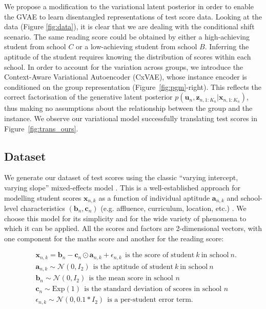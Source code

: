 \documentclass{article} %
\begin{document}
We propose a modification to the variational latent posterior in order to enable the GVAE to learn disentangled representations of test score data. Looking at the data (Figure \ref{fig:data}), it is clear that we are dealing with the conditional shift scenario. The same reading score could be obtained by either a high-achieving student from school $C$ or a low-achieving student from school $B$. Inferring the aptitude of the student requires knowing the distribution of scores within each school. In order to account for the variation across groups, we introduce the Context-Aware Variational Autoencoder (CxVAE), whose instance encoder is conditioned on the group representation (Figure~\ref{fig:pgm}-right). This reflects the correct factorisation of the generative latent posterior $p(\mathbf{u}_n, \mathbf{z}_{n,1:K_n} | \mathbf{x}_{n,1:K_n})$, thus making no assumptions about the relationship between the group and the instance. We observe our variational model successfully translating test scores in Figure~\ref{fig:trans_ours}.

\subsection{Dataset}
\label{sec:dataset}

We generate our dataset of test scores using the classic ``varying intercept, varying slope'' mixed-effects model \citep{Laird1982Random, Pinheiro2001MixedEffectsMI, Gelman2006Data}. This is a well-established approach for modelling student scores $\mathbf{x}_{n,k}$ as a function of individual aptitude $\mathbf{a}_{n,k}$ and school-level characteristics $(\mathbf{b}_n, \mathbf{c}_n)$ (e.g. affluence, curriculum, location, etc.) \citep{Raudenbush1995TheEO, Braun2006ComparingPS}. We choose this model for its simplicity and for the wide variety of phenomena to which it can be applied. All the scores and factors are 2-dimensional vectors, with one component for the maths score and another for the reading score:

\begin{align} \label{eq:score}
& \mathbf{x}_{n,k} = \mathbf{b}_n - \mathbf{c}_n \odot \mathbf{a}_{n,k} + \epsilon_{n,k} ~~ \text{is the score of student} ~ k ~ \text{in school} ~ n.\\
& \mathbf{a}_{n,k} \sim \mathcal{N} (0,I_2) ~~ \text{is the aptitude of student} ~ k ~ \text{in school} ~ n\\
& \mathbf{b}_n \sim \mathcal{N} (0,I_2) ~~ \text{is the mean score in school } n\\
& \mathbf{c}_n \sim \mathrm{Exp} (1) ~~ \text{is the standard deviation of scores in school } n\\
& \epsilon_{n,k} \sim \mathcal{N} (0, 0.1 * I_2) ~~ \text{is a per-student error term.}
\end{align}
\end{document}
